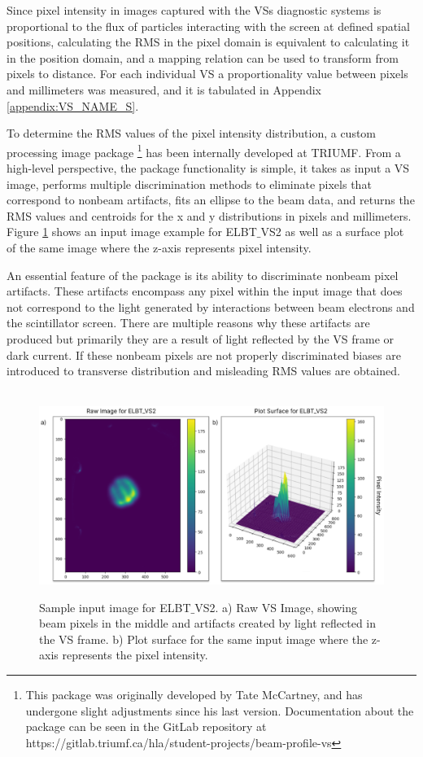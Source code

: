 \documentclass{article}
\begin{document}
Since pixel intensity in images captured with the VSs diagnostic systems is proportional to the flux of particles interacting with the screen at defined spatial positions, calculating the RMS in the pixel domain is equivalent to calculating it in the position domain, and a mapping relation can be used to transform from pixels to distance. For each individual VS a proportionality value between pixels and millimeters was measured, and it is tabulated in Appendix \ref{appendix:VS_NAME_S}. 

To determine the RMS values of the pixel intensity distribution, a custom processing image package \footnote{ This package was originally developed by Tate McCartney, and has undergone slight adjustments since his last version. Documentation about the package can be seen in the GitLab repository at https://gitlab.triumf.ca/hla/student-projects/beam-profile-vs} has been internally developed at TRIUMF. From a high-level perspective, the package functionality is simple, it takes as input a VS image, performs multiple discrimination methods to eliminate pixels that correspond to nonbeam artifacts, fits an ellipse to the beam data, and returns the RMS values and centroids for the x and y distributions in pixels and millimeters. Figure \ref{fig:6} shows an input image example for ELBT$\_$VS2 as well as a surface plot of the same image where the z-axis represents pixel intensity. 
     
An essential feature of the package is its ability to discriminate nonbeam pixel artifacts. These artifacts encompass any pixel within the input image that does not correspond to the light generated by interactions between beam electrons and the scintillator screen. There are multiple reasons why these artifacts are produced but primarily they are a result of light reflected by the VS frame or dark current. If these nonbeam pixels are not properly discriminated biases are introduced to transverse distribution and misleading RMS values are obtained.

\begin{figure}[!h]  
    \centerline{\ \includegraphics[width=\linewidth]{images/example_vs_output.png}}
    \caption{Sample input image for ELBT$\_$VS2. a) Raw VS Image, showing beam pixels in the middle and artifacts created by light reflected in the VS frame. b) Plot surface for the same input image where the z-axis represents the pixel intensity.}
    \label{fig:6}
\end{figure} 
    
\end{document}
